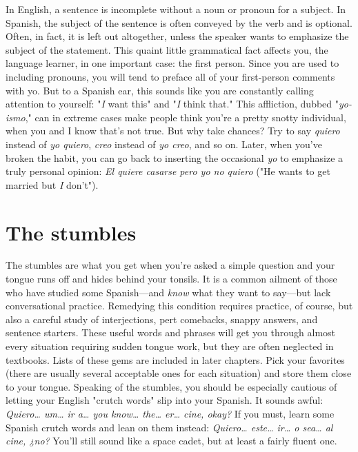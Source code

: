 \documentclass[14pt,a4paper,oneside]{memoir}
\begin{document}
In English, a sentence is incomplete without a noun or pronoun for a subject. In Spanish, the subject of the sentence is often conveyed by the verb and is optional. Often, in fact, it is left out altogether, unless the speaker wants to emphasize the subject of the
statement. This quaint little grammatical fact affects you, the language
learner, in one important case: the first person. Since you are used to
including pronouns, you will tend to preface all of your first-person
comments with yo. But to a Spanish ear, this sounds like you are constantly calling attention to yourself: "\emph{I} want this" and "\emph{I} think that."
This affliction, dubbed "\emph{yo-ismo}," can in extreme cases make people
think you're a pretty snotty individual, when you and I know that's not
true. But why take chances? Try to say \emph{quiero} instead of \emph{yo quiero},
\emph{creo} instead of \emph{yo creo}, and so on. Later, when you've broken the habit,
you can go back to inserting the occasional \emph{yo} to emphasize a truly
personal opinion: \emph{El quiere casarse pero yo no quiero} ("He wants to
get married but \emph{I} don't").

\section{The stumbles}

The stumbles are what you get when you're asked a simple
question and your tongue runs off and hides behind your tonsils. It is a
common ailment of those who have studied some Spanish---and \emph{know}
what they want to say---but lack conversational practice. Remedying
this condition requires practice, of course, but also a careful study of
interjections, pert comebacks, snappy answers, and sentence starters.
These useful words and phrases will get you through almost every
situation requiring sudden tongue work, but they are often neglected
in textbooks. Lists of these gems are included in later chapters. Pick
your favorites (there are usually several acceptable ones for each situation) and store them close to your tongue.
Speaking of the stumbles, you should be especially cautious of
letting your English "crutch words" slip into your Spanish. It sounds
awful: \emph{Quiero\ldots{} um\ldots{} ir a\ldots{} you know\ldots{} the\ldots{} er\ldots{} cine,
	okay?} If you must, learn some Spanish crutch words and lean on them
instead: \emph{Quiero\ldots{} este\ldots{} ir\ldots{} o sea\ldots{} al cine, ¿no?} You'll still
sound like a space cadet, but at least a fairly fluent one.
\end{document}

